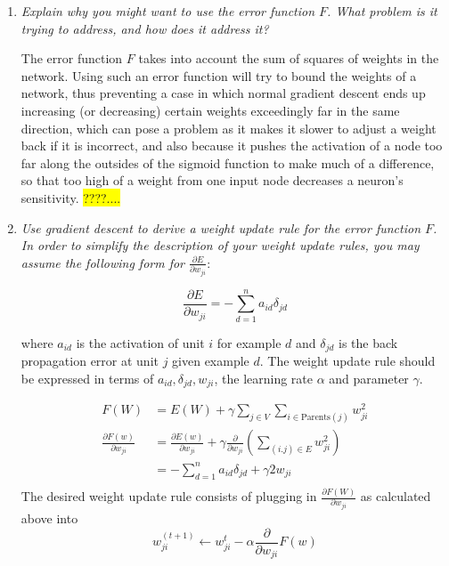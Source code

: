 \documentclass{article}
\newcommand{\edit}[1]{\colorbox{Yellow}{#1}}
\newcommand{\dee}[2]{\frac{\partial{#1}}{\partial{#2}}}
\begin{document}
  \begin{enumerate}
  \item \textit{Explain why you might want to use the error function
    $F$. What problem is it trying to address, and how does it address
    it?}

    The error function $F$ takes into account the sum of squares of weights
    in the network. Using such an error function will try to bound the
    weights of a network, thus preventing a case in which normal gradient
    descent ends up increasing (or decreasing) certain weights exceedingly far
    in the same direction, which can pose a problem as it makes it 
    slower to adjust a weight back if it is incorrect, and also because it pushes
    the activation of a node too far along the outsides of the sigmoid
    function to make much of a difference, so that too high of a weight
    from one input node decreases a neuron's sensitivity. 
    \edit{????....}

  \item \textit{Use gradient descent to derive a weight update rule
    for the error function $F$. In order to simplify the description
    of your weight update rules, you may assume the following form for
    $\frac{\partial E}{\partial w_{ji}}$}:

    \[\frac{\partial E}{\partial w_{ji}} = -\sum_{d=1}^n a_{id}\delta_{jd}\]

    where $a_{id}$ is the activation of unit $i$ for example $d$ and
    $\delta_{jd}$ is the back propagation error at unit $j$ given
    example $d$. The weight update rule should be expressed in terms
    of $a_{id},\delta_{jd},w_{ji}$, the learning rate $\alpha$ and
    parameter $\gamma$.

    \begin{align*}
      F(W) & = E(W)+\gamma\sum_{j\in V}\sum_{i\in \text{Parents}(j)} w_{ji}^2 \\
      \dee{F(w)}{w_{ji}} & = \dee{E(w)}{w_{ji}} + \gamma \dee{}{w_{ji}} \left( \sum_{(i.j)\in E} w_{ji}^2\right) \\
      & = -\sum_{d=1}^n a_{id} \delta_{jd}+ \gamma 2w_{ji}\\
    \end{align*}
    The desired weight update rule consists of plugging in $\dee{F(W)}{w_{ji}}$ as calculated
    above into 
    $$w_{ji}^{(t+1)}\leftarrow w_{ji}^t-\alpha \dee{}{w_{ji}} F(w)$$
  \end{enumerate}
\end{document}
